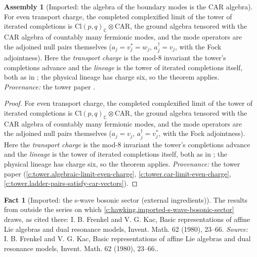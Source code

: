 \documentclass[11pt]{article}
\theoremstyle{definition}
\newtheorem{fact}[theorem]{Fact}
\newtheorem{assembled}[theorem]{Assembly}
\theoremstyle{plain}
\newcommand{\changedmark}[2]{\marginpar{\raggedright\scriptsize\color{#1}#2}}
\providecommand{\C}{}\renewcommand{\C}{\mathbb{C}}
\providecommand{\CAR}{}\renewcommand{\CAR}{\mathrm{CAR}}
\providecommand{\Cl}{}\renewcommand{\Cl}{\mathrm{Cl}}
\begin{document}
\begin{assembled}[Imported: the algebra of the boundary modes is the CAR algebra]\label{c:hawking.imported-algebra-boundary-modes-car-algebra}
\changedmark{gray}{reworded}
For even transport charge, the completed complexified limit of the tower of iterated completions is $\Cl(p,q)_\C \otimes \CAR$, the ground algebra tensored with the CAR algebra of countably many fermionic modes, and the mode operators are the adjoined null pairs themselves ($a_j = v_j^* = w_j$, $a_j^\dagger = v_j$, with the Fock adjointness). Here the \emph{transport charge} is the mod-8 invariant the tower's completions advance and the \emph{lineage} is the tower of iterated completions itself, both as in \cite{ButlerT3}; the physical lineage has charge six, so the theorem applies. \emph{Provenance:} the tower paper \cite[Prop.~4.1, Thms.~5.3 and 5.6]{ButlerT3}.
\end{assembled}
\begin{proof}
For even transport charge, the completed complexified limit of the tower of iterated completions is $\Cl(p,q)_\C \otimes \CAR$, the ground algebra tensored with the CAR algebra of countably many fermionic modes, and the mode operators are the adjoined null pairs themselves ($a_j = v_j$, $a_j^\dagger = v_j^*$, with the Fock adjointness). Here the \emph{transport charge} is the mod-8 invariant the tower's completions advance and the \emph{lineage} is the tower of iterated completions itself, both as in \cite{ButlerT3}; the physical lineage has charge six, so the theorem applies. \emph{Provenance:} the tower paper \cite[Prop.~4.1, Thms.~5.3 and 5.6]{ButlerT3} (\ref{c:tower.algebraic-limit-even-charge}, \ref{c:tower.car-limit-even-charge}, \ref{c:tower.ladder-pairs-satisfy-car-vectors}).

\end{proof}

\begin{fact}[Imported: the s-wave bosonic sector (external ingredients)]\label{c:hawking.imported-s-wave-bosonic-sector-external}
The results from outside the series on which \ref{c:hawking.imported-s-wave-bosonic-sector} draws, as cited there: I. B. Frenkel and V. G. Kac, Basic representations of affine Lie algebras and dual resonance models, Invent. Math. 62 (1980), 23--66.
\emph{Source:} I. B. Frenkel and V. G. Kac, Basic representations of affine Lie algebras and dual resonance models, Invent. Math. 62 (1980), 23--66..
\end{fact}
\end{document}
